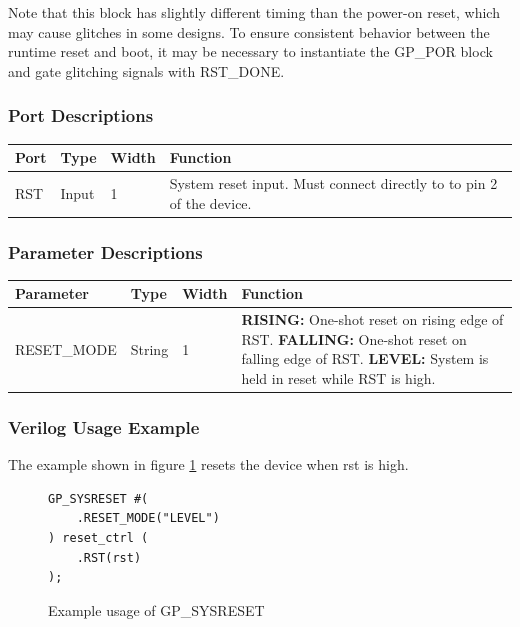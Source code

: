 \documentclass{article}
\begin{document}
Note that this block has slightly different timing than the power-on reset, which may cause glitches in some designs. 
To ensure consistent behavior between the runtime reset and boot, it may be necessary to instantiate the GP\_POR 
block and gate glitching signals with RST\_DONE.

\subsubsection{Port Descriptions}

\begin{tabularx}{5in}{|l|l|l|X|}
\hline
{\bfseries Port} & {\bfseries Type} & {\bfseries Width} & {\bfseries Function} \\
\hline
RST & Input & 1 & System reset input. Must connect directly to to pin 2 of the device.\\
\hline
\end{tabularx}

\subsubsection{Parameter Descriptions}

\begin{tabularx}{5in}{|l|l|l|X|}
\hline
{\bfseries Parameter} & {\bfseries Type} & {\bfseries Width} & {\bfseries Function} \\
\hline
RESET\_MODE & String & 1 & 
	{\bfseries RISING: } \newline One-shot reset on rising edge of RST. \newline
	{\bfseries FALLING: } \newline One-shot reset on falling edge of RST. \newline
	{\bfseries LEVEL: } \newline System is held in reset while RST is high.\\
\hline
\end{tabularx}

\subsubsection{Verilog Usage Example}

The example shown in figure \ref{gp-sysreset-example} resets the device when rst is high.

\begin{figure}[h]
\begin{lstlisting}
GP_SYSRESET #(
	.RESET_MODE("LEVEL")
) reset_ctrl (
	.RST(rst)
);
\end{lstlisting}
\caption{Example usage of GP\_SYSRESET}
\label{gp-sysreset-example}
\end{figure}
\end{document}
